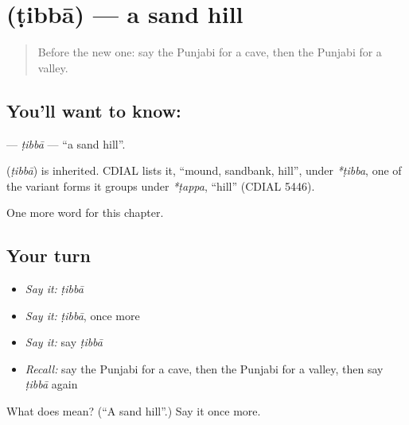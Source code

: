 \section[\texorpdfstring{\pa{ਟਿੱਬਾ} (ṭibbā)}{ਟਿੱਬਾ (ṭibbā)}]{ (ṭibbā) — a sand hill}

\label{lesson:PA-C127-tibba}



\begin{quote}
Before the new one: say the Punjabi for a cave, then the Punjabi for a valley.
\end{quote}

\subsection*{You'll want to know: }
\textbf{} — \emph{ṭibbā} — \textquotedblleft{}a sand hill\textquotedblright{}.

\begin{cousinweb}
\textbf{} (\emph{ṭibbā}) is inherited. CDIAL lists it, \textquotedblleft{}mound, sandbank, hill\textquotedblright{}, under \emph{*ṭibba}, one of the variant forms it groups under \emph{*ṭappa}, \textquotedblleft{}hill\textquotedblright{} (CDIAL 5446).
\end{cousinweb}

\begin{grammarlens}[title={What you've built}]
One more word for this chapter.
\end{grammarlens}

\subsection*{Your turn}
\begin{itemize}
\raggedright
  \item \emph{Say it:} \emph{ṭibbā}
  \item \emph{Say it:} \emph{ṭibbā}, once more
  \item \emph{Say it:} say \emph{ṭibbā}
  \item \emph{Recall:} say the Punjabi for a cave, then the Punjabi for a valley, then say \emph{ṭibbā} again
\end{itemize}

\begin{tcolorbox}[breakable,colback=teal!4,colframe=teal!35!black,title={Before you move on}]
What does  mean? (\textquotedblleft{}A sand hill\textquotedblright{}.) Say it once more.
\end{tcolorbox}
